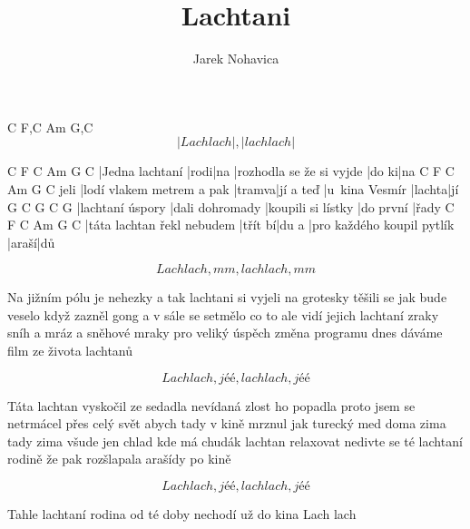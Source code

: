 \documentclass{song}
\author{Jarek Nohavica}
\title{Lachtani}
\begin{document}
   C         F,C  Am        G,C
\[ |Lach lach|,   |lach lach| \]
\endstrophe

\strophe
C               F    C   Am                       G     C
|Jedna lachtaní |rodi|na |rozhodla se že si vyjde |do ki|na
     C                         F      C         Am             G      C
jeli |lodí vlakem metrem a pak |tramva|jí a teď |u~kina Vesmír |lachta|jí
G                C               G                  C         G
|lachtaní úspory |dali dohromady |koupili si lístky |do první |řady
C                          F       C     Am                         G     C
|táta lachtan řekl nebudem |třít bí|du a |pro každého koupil pytlík |araší|dů
\endstrophe

\[ Lach lach, mm, lach lach, mm \]
\endstrophe

\strophe*
Na jižním pólu je nehezky a tak lachtani si vyjeli na grotesky
těšili se jak bude veselo když zazněl gong a v sále se setmělo
co to ale vidí jejich lachtaní zraky sníh a mráz a sněhové mraky
pro veliký úspěch změna programu dnes dáváme film ze života lachtanů
\endstrophe

\[ Lach lach, jéé, lach lach, jéé \]
\endstrophe

\strophe*
Táta lachtan vyskočil ze sedadla nevídaná zlost ho popadla
proto jsem se netrmácel přes celý svět abych tady v kině mrznul jak turecký med
doma zima tady zima všude jen chlad kde má chudák lachtan relaxovat
nedivte se té lachtaní rodině že pak rozšlapala arašídy po kině
\endstrophe

\[ Lach lach, jéé, lach lach, jéé \]
\endstrophe

\strophe*
Tahle lachtaní rodina
od té doby nechodí už do kina
Lach lach
\endstrophe
\end{document}
